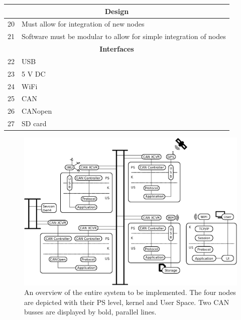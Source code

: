 \begin{table}[H]
\begin{tabular}{ |p{0.3cm}|p{10.5cm}| }
\hline
\multicolumn{2}{|c|}{\textbf{Design}}\\
\hline	
20 & Must allow for integration of new nodes		 					 \\
21 & Software must be modular to allow for simple integration of nodes	 \\

\hline
\multicolumn{2}{|c|}{\textbf{Interfaces}}\\
\hline	
22 & USB 		 						\\
23 & 5 V DC		 						\\
24 & WiFi	 							\\
25 & CAN 		 						\\
26 & CANopen 		 					\\
27 & SD card 		 					\\
\hline
\end{tabular}
\end{table}

\newpage
\begin{figure}[!h]
	\centering
	\includegraphics[angle=90,width=\textwidth]{graphics/analysis_complex.eps}
	\caption[An overview of the entire system to be implemented.]{An overview of the entire system to be implemented. The four nodes are depicted with their PS level, kernel and User Space. Two CAN busses are displayed by bold, parallel lines.}
	\label{fig:complete_system}
\end{figure}


